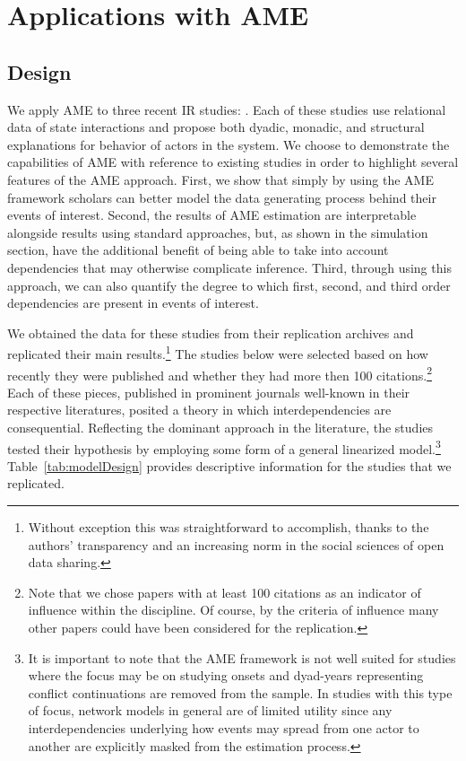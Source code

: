 \section{\textbf{Applications with AME}}

\subsection{Design}

We apply AME to three recent IR studies: \citet{reiter:stam:2003, mcdonald:2004,  weeks:2012, gibler:2017}. Each of these studies use relational data of state interactions and propose both dyadic, monadic, and structural explanations for behavior of actors in the system. We choose to demonstrate the capabilities of AME with reference to existing studies in order to highlight several features of the AME approach. First, we show that simply by using the AME framework scholars can better model the data generating process behind their events of interest. Second, the results of AME estimation are interpretable alongside results using standard approaches, but, as shown in the simulation section, have the additional benefit of being able to take into account dependencies that may otherwise complicate inference. Third, through using this approach, we can also quantify the degree to which first, second, and third order dependencies are present in events of interest.

We obtained the data for these studies from their replication archives and replicated their main results.\footnote{Without exception this was straightforward to accomplish, thanks to the authors' transparency and an increasing norm in the social sciences of open data sharing.} The studies below were selected based on how recently they were published and whether they had more then 100 citations.\footnote{Note that we chose papers with at least 100 citations as an indicator of influence within the discipline. Of course, by the criteria of influence many other papers could have been considered for the replication.} Each of these pieces, published in prominent journals well-known in their respective literatures, posited a theory in which interdependencies are consequential. Reflecting the dominant approach in the literature, the studies tested their hypothesis by employing some form of a general linearized model.\footnote{It is important to note that the AME framework is not well suited for studies where the focus may be on studying onsets and dyad-years representing conflict continuations are removed from the sample. In studies with this type of focus, network models in general are of limited utility since any interdependencies underlying how events may spread from one actor to another are explicitly masked from the estimation process.} Table~\ref{tab:modelDesign} provides descriptive information for the studies that we replicated.

